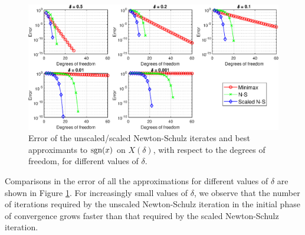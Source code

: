 \begin{figure}[t!]
\centering
   \includegraphics[width=\textwidth,height=\textheight,keepaspectratio]{figures/chapter_3/COMPSIGNvsBEST_DOF_MANY.eps}
   \caption{Error of the unscaled/scaled Newton-Schulz iterates and best approximants to $\text{sgn}(x)$ on $X(\delta)$, with respect to the degrees of freedom, for different values of $\delta$.}
   \label{fig:compsignvsbestDOFmany}
\end{figure}

Comparisons in the error of all the approximations for different values of $\delta$ are shown in Figure \ref{fig:compsignvsbestDOFmany}. For increasingly small values of $\delta$, we observe that the number of iterations required by the unscaled Newton-Schulz iteration in the initial phase of convergence grows faster than that required by the scaled Newton-Schulz iteration. 


